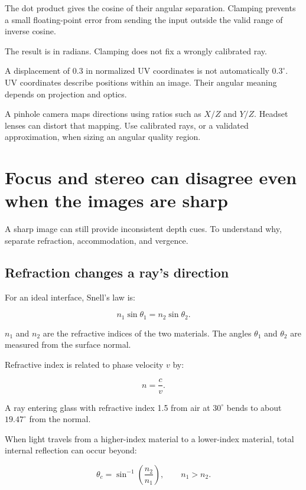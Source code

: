The dot product gives the cosine of their angular separation. Clamping prevents a small floating-point error from sending the input outside the valid range of inverse cosine.

The result is in radians. Clamping does not fix a wrongly calibrated ray.

A displacement of 0.3 in normalized UV coordinates is not automatically \(0.3^\circ\). UV coordinates describe positions within an image. Their angular meaning depends on projection and optics.

A pinhole camera maps directions using ratios such as \(X/Z\) and \(Y/Z\). Headset lenses can distort that mapping. Use calibrated rays, or a validated approximation, when sizing an angular quality region.

\section{Focus and stereo can disagree even when the images are sharp}\label{04-visual-computing-ii-ch043-focus-and-stereo-can-disagree-even-when-the-images-are-sharp}

A sharp image can still provide inconsistent depth cues. To understand why, separate refraction, accommodation, and vergence.

\subsection{Refraction changes a ray's direction}\label{04-visual-computing-ii-ch043-refraction-changes-a-rays-direction}

For an ideal interface, Snell's law is:

\[
n_1\sin\theta_1=n_2\sin\theta_2.
\]

\(n_1\) and \(n_2\) are the refractive indices of the two materials. The angles \(\theta_1\) and \(\theta_2\) are measured from the surface normal.

Refractive index is related to phase velocity \(v\) by:

\[
n=\frac{c}{v}.
\]

A ray entering glass with refractive index 1.5 from air at \(30^\circ\) bends to about \(19.47^\circ\) from the normal.

When light travels from a higher-index material to a lower-index material, total internal reflection can occur beyond:

\[
\theta_c=\sin^{-1}\left(\frac{n_2}{n_1}\right),
\qquad n_1>n_2.
\]

